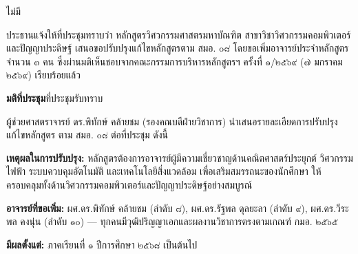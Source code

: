 \documentclass{meetingminutes}
\begin{document}
\maketitle

\begin{participants}
\end{participants}

\noindent ไม่มี\par

\startmeeting
{}


ประธานแจ้งให้ที่ประชุมทราบว่า หลักสูตรวิศวกรรมศาสตรมหาบัณฑิต สาขาวิชาวิศวกรรมคอมพิวเตอร์และปัญญาประดิษฐ์
เสนอขอปรับปรุงแก้ไขหลักสูตรตาม สมอ. ๐๘ โดยขอเพิ่มอาจารย์ประจำหลักสูตรจำนวน ๓ คน
ซึ่งผ่านมติเห็นชอบจากคณะกรรมการบริหารหลักสูตรฯ ครั้งที่ ๑/๒๕๖๙ (๗ มกราคม ๒๕๖๙) เรียบร้อยแล้ว

\noindent\textbf{มติที่ประชุม}\quad ที่ประชุมรับทราบ


ผู้ช่วยศาสตราจารย์ ดร.พิทักษ์ คล้ายชม (รองคณบดีฝ่ายวิชาการ) นำเสนอรายละเอียดการปรับปรุงแก้ไขหลักสูตร
ตาม สมอ. ๐๘ ต่อที่ประชุม ดังนี้

\begin{thailist}
  \item \textbf{เหตุผลในการปรับปรุง:} หลักสูตรต้องการอาจารย์ผู้มีความเชี่ยวชาญด้านคณิตศาสตร์ประยุกต์
  วิศวกรรมไฟฟ้า ระบบควบคุมอัตโนมัติ และเทคโนโลยีสิ่งแวดล้อม เพื่อเสริมสมรรถนะของนักศึกษา
  ให้ครอบคลุมทั้งด้านวิศวกรรมคอมพิวเตอร์และปัญญาประดิษฐ์อย่างสมบูรณ์
  \item \textbf{อาจารย์ที่ขอเพิ่ม:} ผศ.ดร.พิทักษ์ คล้ายชม (ลำดับ ๘), ผศ.ดร.รัฐพล ดุลยะลา (ลำดับ ๙),
  ผศ.ดร.วีระพล คงนุ่น (ลำดับ ๑๐) — ทุกคนมีวุฒิปริญญาเอกและผลงานวิชาการตรงตามเกณฑ์ กมอ. ๒๕๖๕
  \item \textbf{มีผลตั้งแต่:} ภาคเรียนที่ ๑ ปีการศึกษา ๒๕๖๘ เป็นต้นไป
\end{thailist}
\end{document}
